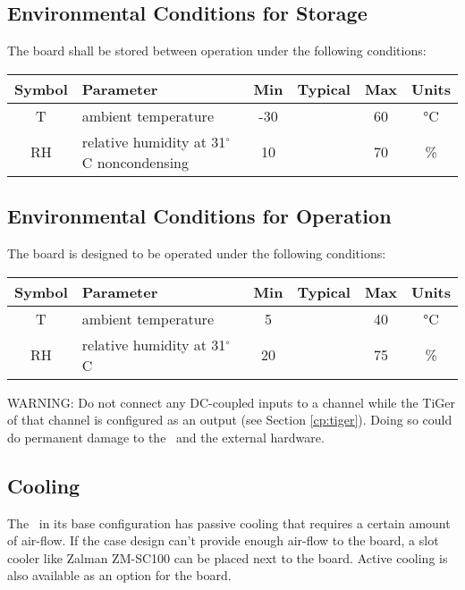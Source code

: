 \subsection{Environmental Conditions for Storage}

	The board shall be stored between operation under the following conditions:

	\noindent
	\begin{tabularx}{\textwidth}{|c|X|c|c|c|c|}
		\hline
		Symbol & Parameter & Min & Typical & Max & Units\\
		\hline\hline
		T & ambient temperature & -30 && 60 & \si{\degreeCelsius}\\
		\hline
		RH & relative humidity at 31$^{\circ}$C noncondensing & 10 && 70 & \%\\
		\hline
	\end{tabularx}

\clearpage
\subsection{Environmental Conditions for Operation}

	The board is designed to be operated under the following conditions:

	\noindent
	\begin{tabularx}{\textwidth}{|c|X|c|c|c|c|}
		\hline
		Symbol & Parameter & Min & Typical & Max & Units\\
		\hline\hline
		T & ambient temperature & 5 && 40 & \si{\degreeCelsius}\\
		\hline
		RH & relative humidity at 31$^{\circ}$C & 20 && 75 & \%\\
		\hline
	\end{tabularx}

	WARNING: Do not connect any DC-coupled inputs to a channel while the TiGer of that channel is configured as an output (see Section \ref{cp:tiger}).
	Doing so could do permanent damage to the \deviceName\ and the external hardware.

\subsection{Cooling}

	The \deviceName\ in its base configuration has passive cooling that requires a certain amount of air-flow. 
	If the case design can't provide enough air-flow to the board, a slot cooler like Zalman ZM-SC100 can be placed next to the board. 
	Active cooling is also available as an option for the board.


